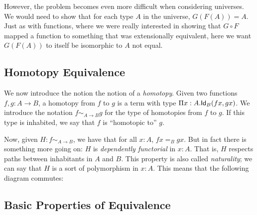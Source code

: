 \documentclass[12pt]{article}
\newcommand{\ap}{\mathsf{ap}}
\begin{document}
However, the problem becomes even more difficult when considering universes.
We would need to show that for each type $A$ in the universe, $G(F(A)) = A$.
Just as with functions, where we were really interested in showing that $G
\circ F$ mapped a function to something that was extensionally equivalent, here
we want $G(F(A))$ to itself be isomorphic to $A$ not equal.

\subsection{Homotopy Equivalence}

We now introduce the notion the notion of a \emph{homotopy}. Given two
functions $f, g : A \to B$, a homotopy from $f$ to $g$ is a term with type $\Pi
x:A.  \mathsf{Id}_{B} (f x, g x)$. We introduce the notation $f\sim_{A \to B} g$ for the
type of homotopies from $f$ to $g$. If this type is inhabited, we say that $f$
is ``homotopic to'' $g$.

Now, given $H : f\sim_{A \to B}$, we have that for all $x:A$, $f x =_B g x$.
But in fact there is something more going on: $H$ is \emph{dependently
functorial} in $x:A$. That is, $H$ respects paths between inhabitants in $A$
and $B$.  This property is also called \emph{naturality}; we can say that $H$
is a sort of polymorphism in $x:A$. This means that the following diagram
commutes:

\begin{center}
\end{center}


\subsection{Basic Properties of Equivalence}\label{subsec:equiv}
\end{document}
